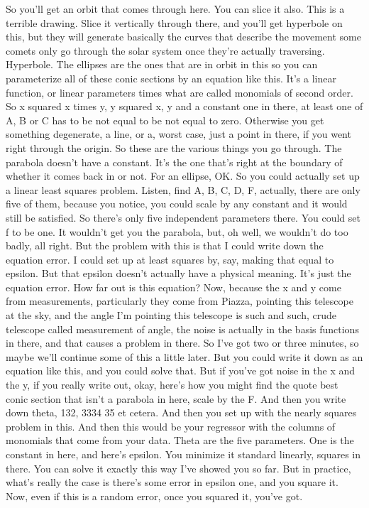 \documentclass[11pt,a4paper]{article}
\begin{document}
So you'll get an orbit that comes through here. You can slice it also. This is a terrible drawing. Slice it vertically through there, and you'll get hyperbole on this, but they will generate basically the curves that describe the movement some comets only go through the solar system once they're actually traversing. Hyperbole. The ellipses are the ones that are in orbit in this so you can parameterize all of these conic sections by an equation like this. It's a linear function, or linear parameters times what are called monomials of second order. So x squared x times y, y squared x, y and a constant one in there, at least one of A, B or C has to be not equal to be not equal to zero. Otherwise you get something degenerate, a line, or a, worst case, just a point in there, if you went right through the origin. So these are the various things you go through. The parabola doesn't have a constant. It's the one that's right at the boundary of whether it comes back in or not. For an ellipse, OK. So you could actually set up a linear least squares problem. Listen, find A, B, C, D, F, actually, there are only five of them, because you notice, you could scale by any constant and it would still be satisfied. So there's only five independent parameters there. You could set f to be one. It wouldn't get you the parabola, but, oh well, we wouldn't do too badly, all right. But the problem with this is that I could write down the equation error. I could set up at least squares by, say, making that equal to epsilon. But that epsilon doesn't actually have a physical meaning. It's just the equation error. How far out is this equation? Now, because the x and y come from measurements, particularly they come from Piazza, pointing this telescope at the sky, and the angle I'm pointing this telescope is such and such, crude telescope called measurement of angle, the noise is actually in the basis functions in there, and that causes a problem in there. So I've got two or three minutes, so maybe we'll continue some of this a little later. But you could write it down as an equation like this, and you could solve that. But if you've got noise in the x and the y, if you really write out, okay, here's how you might find the quote best conic section that isn't a parabola in here, scale by the F. And then you write down theta, 132, 3334 35 et cetera. And then you set up with the nearly squares problem in this. And then this would be your regressor with the columns of monomials that come from your data. Theta are the five parameters. One is the constant in here, and here's epsilon. You minimize it standard linearly, squares in there. You can solve it exactly this way I've showed you so far. But in practice, what's really the case is there's some error in epsilon one, and you square it. Now, even if this is a random error, once you squared it, you've got.
\end{document}

